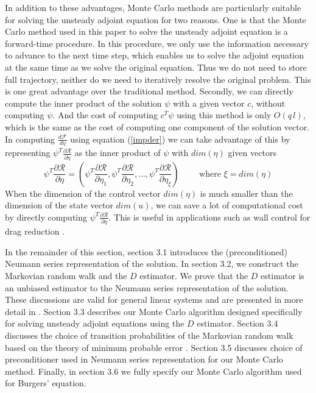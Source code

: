 \documentclass{elsart}
\theoremstyle{remark}
\theoremstyle{definition}
\theoremstyle{proof}
\begin{document}
    In addition to these advantages, Monte Carlo methods are
    particularly suitable for solving the unsteady adjoint equation for
    two reasons.  One is that the Monte Carlo method used in this paper
    to solve the unsteady adjoint equation is a forward-time procedure.
    In this procedure, we only use the information necessary to
    advance to the next time step, which enables us to solve the adjoint
    equation at the same time as we solve the original equation.  Thus we
    do not need to store full trajectory, neither do we need to
    iteratively resolve the original problem.  This is one great
    advantage over the traditional method.  Secondly, we can directly
    compute the inner product of the solution $\psi$ with a given vector
    $c$, without computing $\psi$.  And the cost of computing $c^T \psi$
    using this method is only $O(q\,l)$, which is the same as the cost of
    computing one component of the solution vector.  In computing
    $\frac{d\mathcal{F}}{d\eta}$ using equation (\ref{impder}) we can take
    advantage of this by representing $\psi^T \frac{\partial
    \mathcal{R}}{\partial \eta}$ as the inner product of $\psi$ with
    $dim(\eta)$ given vectors
    \[ \psi^T \frac{\partial \mathcal{R}}{\partial \eta}
        = \left( \psi^T \frac{\partial \mathcal{R}}{\partial \eta_1},
                 \psi^T \frac{\partial \mathcal{R}}{\partial \eta_2}, \ldots,
                 \psi^T \frac{\partial \mathcal{R}}{\partial \eta_\xi}
          \right) \qquad \mbox{ where } \xi = dim(\eta)
    \]
    When the dimension of the control vector $dim(\eta)$ is much smaller than
    the dimension of the state vector $dim(u)$, we can save a lot of
    computational cost by directly computing
    $\psi^T \frac{\partial \mathcal{R}}{\partial \eta}$.
    This is useful in applications such as wall control for drag reduction
    \cite{Choi1993} \cite{Bewley2001}.
    
    In the remainder of this section, section 3.1 introduces the
    (preconditioned) Neumann series representation of the solution.
    In section 3.2, we construct the Markovian random walk and the $D$
    estimator.  We prove that the $D$ estimator is an unbiased estimator
    to the Neumann series representation of the solution.  These discussions
    are valid for general linear systems and are presented in more detail in
    \cite{Okten2005}.  Section 3.3 describes our Monte Carlo algorithm
    designed specifically for solving unsteady adjoint equations using
    the $D$ estimator.  Section 3.4 discusses the choice of transition
    probabilities of the Markovian random walk based on the theory of
    minimum probable error \cite{Dimov1991}.  Section 3.5 discusses choice
    of preconditioner used in Neumann series representation for our
    Monte Carlo method.  Finally, in section 3.6 we fully specify our
    Monte Carlo algorithm used for Burgers' equation.
    
\end{document}
